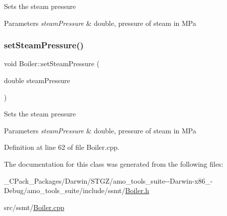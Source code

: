 Sets the steam pressure 
\begin{DoxyParams}{Parameters}
{\em steam\+Pressure} & double, pressure of steam in M\+Pa \\
\hline
\end{DoxyParams}
\mbox{\label{class_boiler_a0a4619ff73c9969daebe3aa66ddad6be}} 
\subsubsection{\texorpdfstring{set\+Steam\+Pressure()}{setSteamPressure()}\hspace{0.1cm}{\footnotesize\ttfamily [3/3]}}
{\footnotesize\ttfamily void Boiler\+::set\+Steam\+Pressure (\begin{DoxyParamCaption}\item[{double}]{steam\+Pressure }\end{DoxyParamCaption})}

Sets the steam pressure 
\begin{DoxyParams}{Parameters}
{\em steam\+Pressure} & double, pressure of steam in M\+Pa \\
\hline
\end{DoxyParams}


Definition at line 62 of file Boiler.\+cpp.



The documentation for this class was generated from the following files\+:\begin{DoxyCompactItemize}
\item 
\+\_\+\+C\+Pack\+\_\+\+Packages/\+Darwin/\+S\+T\+G\+Z/amo\+\_\+tools\+\_\+suite-\/-\/\+Darwin-\/x86\+\_-\/\+Debug/amo\+\_\+tools\+\_\+suite/include/ssmt/\hyperlink{___c_pack___packages_2_darwin_2_s_t_g_z_2amo__tools__suite--_darwin-x86__64-_debug_2amo__tools__7b788f9ca0770ad621a2356b855bf0c2}{Boiler.\+h}\item 
src/ssmt/\hyperlink{_boiler_8cpp}{Boiler.\+cpp}\end{DoxyCompactItemize}
